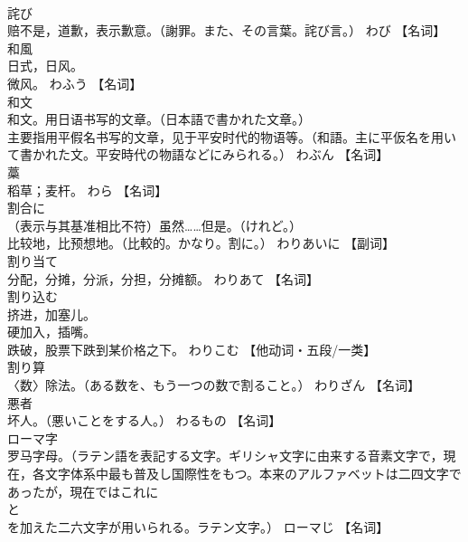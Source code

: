 \documentclass[8pt]{extreport}
\begin{document}
\begin{CJK}{UTF8}{min}
\\	詫び	
\\	赔不是，道歉，表示歉意。（謝罪。また、その言葉。詫び言。）	わび		【名词】
\\	和風	
\\	日式，日风。 
\\	微风。	わふう		【名词】
\\	和文	
\\	和文。用日语书写的文章。（日本語で書かれた文章。） 
\\	主要指用平假名书写的文章，见于平安时代的物语等。（和語。主に平仮名を用いて書かれた文。平安時代の物語などにみられる。）	わぶん		【名词】
\\	藁	
\\	稻草；麦杆。	わら		【名词】
\\	割合に	
\\	（表示与其基准相比不符）虽然……但是。（けれど。） 
\\	比较地，比预想地。（比較的。かなり。割に。）	わりあいに		【副词】
\\	割り当て	
\\	分配，分摊，分派，分担，分摊额。	わりあて		【名词】
\\	割り込む	
\\	挤进，加塞儿。 
\\	硬加入，插嘴。 
\\	跌破，股票下跌到某价格之下。	わりこむ		【他动词・五段/一类】
\\	割り算	
\\	〈数〉除法。（ある数を、もう一つの数で割ること。）	わりざん		【名词】
\\	悪者	
\\	坏人。（悪いことをする人。）	わるもの		【名词】
\\	ローマ字	
\\	罗马字母。（ラテン語を表記する文字。ギリシャ文字に由来する音素文字で，現在，各文字体系中最も普及し国際性をもつ。本来のアルファベットは二四文字であったが，現在ではこれに 
\\	と 
\\	を加えた二六文字が用いられる。ラテン文字。）	ローマじ		【名词】
\end{CJK}
\end{document}
